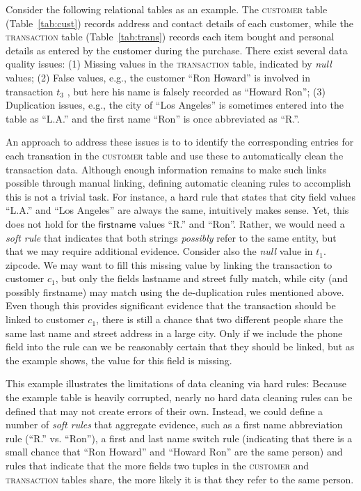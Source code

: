 Consider the following relational tables as an example. The \textsc{customer} table (Table~\ref{tab:cust}) records address and contact details of each customer, while the \textsc{transaction} table (Table~\ref{tab:trans}) records each item bought and personal details as entered by the customer during the purchase. 
There exist several data quality issues: (1) Missing values in the \textsc{transaction} table, indicated by \emph{null} values; (2) False values, e.g.,  the customer ``Ron Howard'' is involved in transaction $t_3$ , but here his name is falsely recorded as ``Howard Ron''; (3) Duplication issues, e.g., the city of ``Los Angeles'' is sometimes entered into the table as ``L.A.'' and the first name ``Ron'' is once abbreviated as ``R.''. 

An approach to address these issues is to to identify the corresponding entries for each transation in the \textsc{customer} table and use these to automatically clean the transaction data. Although enough information remains to make such links possible through manual linking, defining automatic cleaning rules to accomplish this is not a trivial task. For instance, a hard rule that states that $\textsf{city}$ field values ``L.A.'' and ``Los Angeles'' are always the same, intuitively makes sense. Yet, this does not hold for the $\textsf{firstname}$ values ``R.'' and ``Ron''. Rather, we would need a \emph{soft rule} that indicates that both strings \emph{possibly} refer to the same entity, but that we may require additional evidence. Consider also the \emph{null} value in $t_1.$\textsf{zipcode}. We may want to fill this missing value by linking the transaction to customer $c_1$, but only the fields \textsf{lastname} and \textsf{street} fully match, while \textsf{city} (and possibly \textsf{firstname}) may match using the de-duplication rules mentioned above. Even though this provides significant evidence that the transaction should be linked to customer $c_1$, there is still a chance that two different people share the same last name and street address in a large city. Only if we include the \textsf{phone} field into the rule can we be reasonably certain that they should be linked, but as the example shows, the value for this field is missing. 

This example illustrates the limitations of data cleaning via hard rules: Because the example table is heavily corrupted, nearly no hard data cleaning rules can be defined that may not create errors of their own. Instead, we could define a number of \emph{soft rules} that aggregate evidence, such as a first 
name abbreviation rule (``R.'' vs. ``Ron''), a first and last name switch rule (indicating that there is a small chance that ``Ron Howard'' and ``Howard Ron'' are the same person) and rules that indicate that the more fields two tuples in the \textsc{customer} and \textsc{transaction} tables share, the more likely 
it is that they refer to the same person. 

